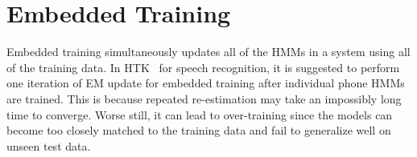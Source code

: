 \section{Embedded Training}
Embedded training simultaneously updates all of the HMMs in a system using all
of the training data. In HTK~\cite{young1994} for speech recognition, it is
suggested to perform one iteration of EM update for embedded training after
individual phone HMMs are trained.
This is because repeated re-estimation may take an impossibly long time to converge. Worse still, it can
lead to over-training since the models can become too closely matched to the
training data and fail to generalize well on unseen test data.

% 
